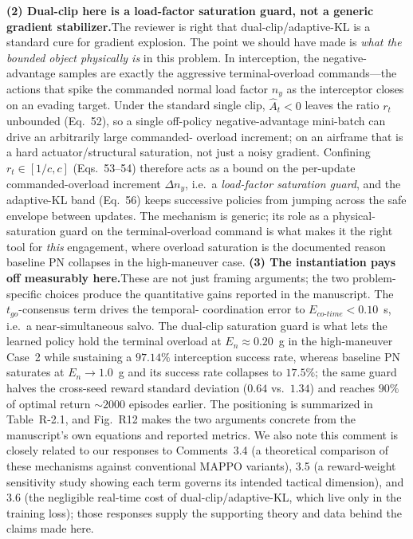\documentclass[11pt]{article}
\begin{document}
\medskip\noindent\textbf{(2) Dual-clip here is a load-factor saturation guard, not a
generic gradient stabilizer.}\quad The reviewer is right that dual-clip/adaptive-KL is a
standard cure for gradient explosion. The point we should have made is \emph{what the
bounded object physically is} in this problem. In interception, the negative-advantage
samples are exactly the aggressive terminal-overload commands---the actions that spike the
commanded normal load factor $n_{y}$ as the interceptor closes on an evading target. Under
the standard single clip, $\hat A_t<0$ leaves the ratio $r_t$ unbounded (Eq.~52), so a
single off-policy negative-advantage mini-batch can drive an arbitrarily large commanded-
overload increment; on an airframe that is a hard actuator/structural saturation, not just
a noisy gradient. Confining $r_t\in[1/c,c]$ (Eqs.~53--54) therefore acts as a bound on the
per-update commanded-overload increment $\Delta n_y$, i.e.\ a \emph{load-factor saturation
guard}, and the adaptive-KL band (Eq.~56) keeps successive policies from jumping across
the safe envelope between updates. The mechanism is generic; its role as a
physical-saturation guard on the terminal-overload command is what makes it the right tool
for \emph{this} engagement, where overload saturation is the documented reason baseline PN
collapses in the high-maneuver case.
\medskip\noindent\textbf{(3) The instantiation pays off measurably here.}\quad These are
not just framing arguments; the two problem-specific choices produce the quantitative
gains reported in the manuscript. The $t_{go}$-consensus term drives the temporal-
coordination error to $E_{co\text{-}time}<0.10$~s, i.e.\ a near-simultaneous salvo. The
dual-clip saturation guard is what lets the learned policy hold the terminal overload at
$E_n\!\approx\!0.20$~g in the high-maneuver Case~2 while sustaining a $97.14\%$
interception success rate, whereas baseline PN saturates at $E_n\!\to\!1.0$~g and its
success rate collapses to $17.5\%$; the same guard halves the cross-seed reward standard
deviation ($0.64$ vs.\ $1.34$) and reaches $90\%$ of optimal return $\sim\!2000$ episodes
earlier. The positioning is summarized in Table~R-2.1, and Fig.~R12
makes the two arguments concrete from the manuscript's own equations and reported metrics.
We also note this comment is closely related to our responses to Comments~3.4 (a
theoretical comparison of these mechanisms against conventional MAPPO variants), 3.5 (a
reward-weight sensitivity study showing each term governs its intended tactical
dimension), and 3.6 (the negligible real-time cost of dual-clip/adaptive-KL, which live
only in the training loss); those responses supply the supporting theory and data behind
the claims made here.
\end{document}

